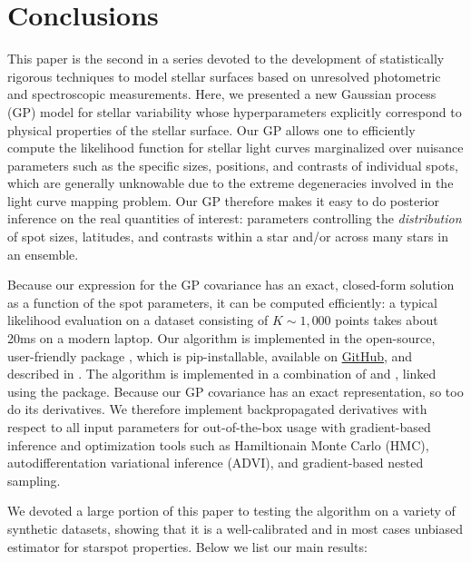 \documentclass[modern,linenumbers]{aastex62}
\begin{document}
\section{Conclusions}
\label{sec:conclusions}

This paper is the second in a series devoted to the development of
statistically rigorous techniques to model stellar surfaces based on
unresolved photometric and spectroscopic measurements.
%
Here, we presented a new Gaussian process (GP) model for stellar variability
whose hyperparameters explicitly correspond to physical properties of the stellar
surface. Our GP allows one to efficiently compute the likelihood function
for stellar light curves
marginalized over nuisance parameters such as the specific sizes,
positions, and contrasts of individual spots,
which are generally unknowable due to the extreme degeneracies
involved in the light curve mapping problem. Our GP therefore
makes it easy to
do posterior inference on the real quantities of interest: parameters
controlling the \emph{distribution} of spot sizes, latitudes, and
contrasts within a star and/or across many stars in an ensemble.

Because our expression for the GP covariance has an exact, closed-form
solution as a function of the spot parameters, it can be computed
efficiently: a typical likelihood evaluation on a dataset
consisting of $K \sim 1{,}000$ points takes about 20ms on a modern
laptop. Our algorithm is implemented in the open-source, user-friendly
\Python package \starryprocess, which is \textsf{pip}-installable, available on
\href{https://github.com/rodluger/starry_process}{GitHub}, and
described in \citet{JOSSPaper}.
The algorithm is implemented in a combination of \cpp and \Python,
linked using the \theano package. Because our GP covariance has an exact
representation, so too do its derivatives. We therefore implement
backpropagated derivatives with respect to all input parameters for
out-of-the-box usage with gradient-based inference and optimization
tools such as Hamiltionain Monte Carlo (HMC), autodifferentation
variational inference (ADVI), and gradient-based nested sampling.

We devoted a large portion of this paper to testing the algorithm on a variety
of synthetic datasets, showing that it is a well-calibrated and in most
cases unbiased estimator for starspot properties. Below we list our main
results:
\end{document}
